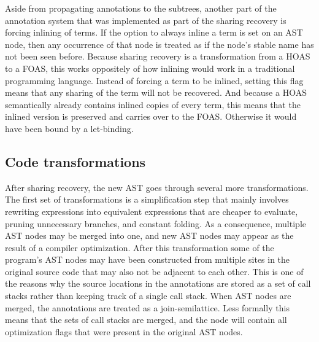 \documentclass[fontsize=11pt,a4paper,parskip=half,numbers=noenddot]{scrartcl}
\begin{document}
Aside from propagating annotations to the subtrees, another part of the
annotation system that was implemented as part of the sharing recovery is
forcing inlining of terms. If the option to always inline a term is set on an
AST node, then any occurrence of that node is treated as if the node's stable
name has not been seen before. Because sharing recovery is a transformation from
a HOAS to a FOAS, this works oppositely of how inlining would work in a
traditional programming language. Instead of forcing a term to be inlined,
setting this flag means that any sharing of the term will not be recovered. And
because a HOAS semantically already contains inlined copies of every term, this
means that the inlined version is preserved and carries over to the FOAS.\@
Otherwise it would have been bound by a let-binding.

\subsection{Code transformations}


After sharing recovery, the new AST goes through several more transformations.
The first set of transformations is a simplification step that mainly involves
rewriting expressions into equivalent expressions that are cheaper to evaluate,
pruning unnecessary branches, and constant folding. As a consequence, multiple
AST nodes may be merged into one, and new AST nodes may appear as the result of
a compiler optimization. After this transformation some of the program's AST
nodes may have been constructed from multiple sites in the original source code
that may also not be adjacent to each other. This is one of the reasons why the
source locations in the annotations are stored as a set of call stacks rather
than keeping track of a single call stack. When AST nodes are merged, the
annotations are treated as a join-semilattice. Less formally this means that the
sets of call stacks are merged, and the node will contain all optimization flags
that were present in the original AST nodes.
\end{document}
